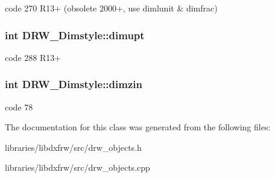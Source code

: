code 270 R13+ (obsolete 2000+, use dimlunit \& dimfrac) \hypertarget{classDRW__Dimstyle_ada5b945b12f79ebe3246b9b4830eab68}{
\subsubsection[{dimupt}]{\setlength{\rightskip}{0pt plus 5cm}int D\-R\-W\-\_\-\-Dimstyle\-::dimupt}}\label{classDRW__Dimstyle_ada5b945b12f79ebe3246b9b4830eab68}
code 288 R13+ \hypertarget{classDRW__Dimstyle_a4922b8e483f9e2ae67ea92aa4f7503c8}{
\subsubsection[{dimzin}]{\setlength{\rightskip}{0pt plus 5cm}int D\-R\-W\-\_\-\-Dimstyle\-::dimzin}}\label{classDRW__Dimstyle_a4922b8e483f9e2ae67ea92aa4f7503c8}
code 78 

The documentation for this class was generated from the following files\-:\begin{DoxyCompactItemize}
\item 
libraries/libdxfrw/src/drw\-\_\-objects.\-h\item 
libraries/libdxfrw/src/drw\-\_\-objects.\-cpp\end{DoxyCompactItemize}
